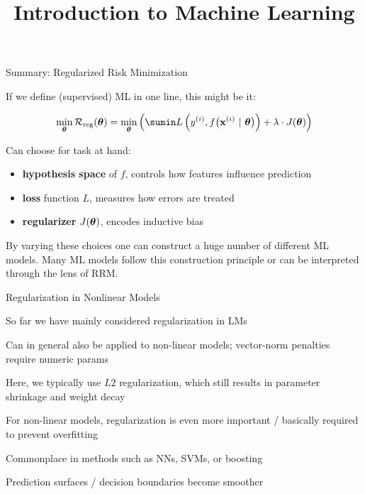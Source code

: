 \documentclass[11pt,compress,t,notes=noshow, xcolor=table]{beamer}
\title{Introduction to Machine Learning}
\begin{document}




\begin{frame}{Summary: Regularized Risk Minimization}

If we define (supervised) ML in one line, this might be it:

$$
\min_{\thetav} \riskrt= \min_{\thetav} \left(\sumin \Lxyit + \lambda \cdot J(\thetav) \right)
$$

Can choose for task at hand:

\begin{itemize}
  \item \textbf{hypothesis space} of $f$, controls how features influence prediction
  \item \textbf{loss} function $L$, measures how errors are treated
  \item \textbf{regularizer} $J(\bm{\theta})$, encodes inductive bias 
\end{itemize}

\vfill

By varying these choices one can construct a huge number of different ML models. 
Many ML models follow this construction principle or can be interpreted through 
the lens of RRM.

\end{frame}


\begin{framei}[sep=L]{Regularization in Nonlinear Models}

  \item So far we have mainly considered regularization in LMs
  \item Can in general also be applied to non-linear models; vector-norm penalties require numeric params 
  \item Here, we typically use $L2$ regularization, which
    still results in parameter shrinkage and weight decay
  \item For non-linear models, regularization is even more important / basically required to prevent overfitting
  \item Commonplace in methods such as NNs, SVMs, or boosting
  \item Prediction surfaces / decision boundaries become smoother

\end{framei}
\end{document}
